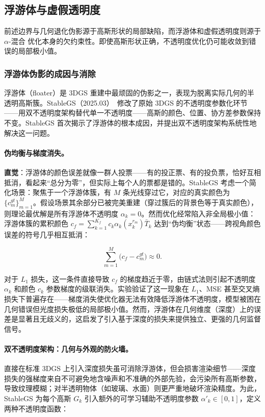 \subsection{浮游体与虚假透明度}

前述边界与几何退化伪影源于高斯形状的局部缺陷，而浮游体和虚假透明度则源于 $\alpha$-混合 优化本身的欠约束性。即使高斯形状正确，不透明度优化仍可能收敛到错误的局部极小值。

\subsubsection{浮游体伪影的成因与消除}

浮游体（floater）是 3DGS 重建中最顽固的伪影之一，表现为脱离实际几何的半透明高斯簇。StableGS（2025.03）~\cite{2503_18458}修改了原始 3DGS 的不透明度参数化环节——用双不透明度架构替代单一不透明度——高斯的颜色、位置、协方差参数保持不变。StableGS 首次揭示了浮游体的根本成因，并提出双不透明度架构系统性地解决这一问题。

\paragraph{伪均衡与梯度消失。}\textbf{直觉}：浮游体的颜色误差就像一群人投票——有的投正票、有的投负票，恰好互相抵消，看起来``总分为零''，但实际上每个人的票都是错的。StableGS 考虑一个简化场景：聚焦于一个浮游体簇，有 $M$ 条光线穿过它，对应的真实颜色为 $\{c_m^{gt}\}_{m=1}^M$。假设场景其余部分已被完美重建（穿过簇后的背景色等于真实颜色），则理论最优解是所有浮游体不透明度 $\alpha_k = 0$。然而优化经常陷入非全局极小值：浮游体簇的累积颜色 $c_f = \sum_{k=1}^{K_f} c_k \alpha_k(x_k^{r_m}) \bar{T}_k$ 达到``伪均衡''状态——跨视角颜色误差的符号几乎相互抵消：

\begin{equation}
\sum_{m=1}^{M}\bigl(c_f - c_m^{gt}\bigr) \approx 0.
\label{eq:02_pseudo_equilibrium}
\end{equation}

对于 $L_1$ 损失，这一条件直接导致 $c_f$ 的梯度趋近于零，由链式法则引起不透明度 $\alpha_k$ 和颜色 $c_k$ 参数梯度的级联消失。实验验证了这一现象在 $L_1$、MSE 甚至交叉熵损失下普遍存在——梯度消失使优化器无法有效降低浮游体不透明度，模型被困在几何错误但光度损失极低的局部极小值。然而，浮游体在几何维度（深度）上的误差是显著且无歧义的，这启发了引入基于深度的损失来提供独立、更强的几何监督信号。

\paragraph{双不透明度架构：几何与外观的防火墙。}直接在标准 3DGS 上引入深度损失虽可消除浮游体，但会损害渲染细节——深度损失的强梯度来自不可避免地含噪声和不准确的外部先验，会污染所有高斯参数，导致纹理模糊；对半透明物体（如玻璃、水面）则更严重地破坏渲染精度。为此，StableGS 为每个高斯 $G_k$ 引入额外的可学习辅助不透明度参数 $\alpha'_k \in [0,1]$，定义两种不透明度函数：

